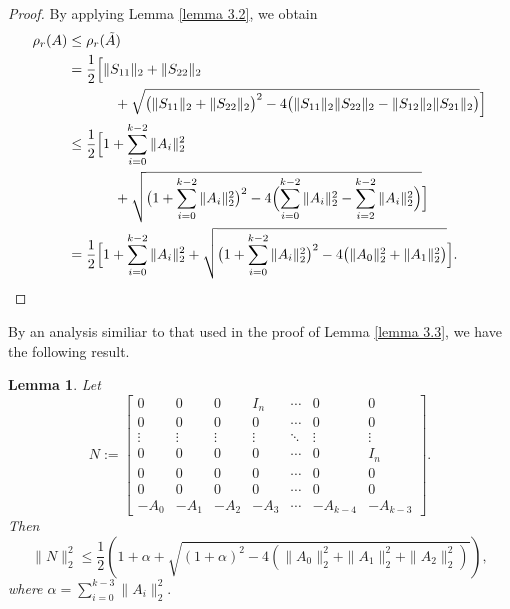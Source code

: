\documentclass [12pt]{article}
\newtheorem{lemma}[theorem]{Lemma}
\begin{document}
\begin{proof}
By applying Lemma \ref{lemma 3.2}, we obtain
\newpage
\begin{align*}
\rho_r(A) &\leq \rho_r(\tilde{A}) \\
&= \begin{aligned}[t] &\frac{1}{2} \Bigl[ \|S_{11}\|_{2} + \|S_{22}\|_2 \\
&\qquad + \sqrt{\bigl( \|S_{11}\|_{2} + \|S_{22}\|_2 \bigr)^2 - 4 \bigl( \|S_{11}\|_{2}\|S_{22}\|_{2}-\|S_{12}\|_{2}\|S_{21}\|_{2} \bigr) } \Bigr] \end{aligned} \\
&\le \begin{aligned}[t] &\frac{1}{2} \Bigl[ 1 + \sum_{i=0}^{k-2}\|A_{i}\|_{2}^{2} \\
&\qquad + \sqrt{\bigl( 1 + \sum_{i=0}^{k-2}\|A_{i}\|_{2}^{2}\bigr)^{2} - 4 \Bigl(\sum_{i=0}^{k-2}\|A_{i}\|_{2}^{2}-\sum_{i=2}^{k-2}\|A_{i}\|^{2}_{2} \Bigr)} \Bigr] \end{aligned} \\
&=\frac{1}{2} \Bigl[ 1 + \sum_{i=0}^{k-2}\|A_{i}\|_{2}^{2} + \sqrt{\bigl( 1 + \sum_{i=0}^{k-2}\|A_{i}\|_{2}^{2}\bigr)^{2} - 4 \bigl( \|A_{0}\|^{2}_{2}+\|A_{1}\|^{2}_{2}\bigr)} \Bigr].
\end{align*}
\end{proof}
\noindent By an analysis similiar to that used in the proof of Lemma \ref{lemma 3.3}, we have the following result. 
\begin{lemma}{\label{lemma 3.4}}
    Let \[
N := 
\begin{bmatrix}
0 &0 & 0&I_n & \cdots & 0&0 \\
0 & 0 &0&0& \cdots &0 & 0 \\
\vdots & \vdots & \vdots&\vdots & \ddots & \vdots & \vdots\\
0 & 0 & 0 & 0&\cdots & 0 &I_{n}\\
0 & 0 & 0 &0& \cdots & 0 & 0\\
0 & 0 & 0 &0& \cdots & 0 &0\\
-A_0 & -A_1 & -A_2 &-A_3& \cdots & -A_{k-4}&-A_{k-3}
\end{bmatrix}.
\]
Then $$\|N\|^{2}_{2}\le \dfrac{1}{2}\left( 1+ \alpha+ \sqrt{(1+\alpha)^{2}-4\left(\|A_{0}\|_{2}^{2}+\|A_{1}\|_{2}^{2}+\|A_{2}\|^{2}_{2}\right)}\right),$$
where $\alpha=\sum_{i=0}^{k-3}\|A_{i}\|_{2}^{2}.$
\end{lemma}

    
\end{document}
